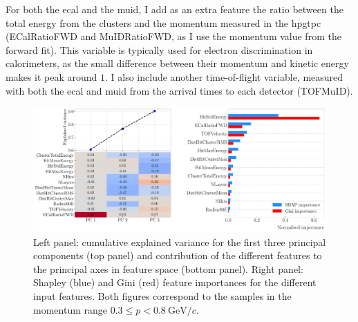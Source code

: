 For both the \gls{ecal} and the \gls{muid}, I add as an extra feature the ratio between the total energy from the clusters and the momentum measured in the \gls{hpgtpc} (ECalRatioFWD and MuIDRatioFWD, as I use the momentum value from the forward fit). This variable is typically used for electron discrimination in calorimeters, as the small difference between their momentum and kinetic energy makes it peak around $1$. I also include another time-of-flight variable, measured with both the \gls{ecal} and \gls{muid} from the arrival times to each detector (TOFMuID).

\begin{figure}[t]
	\centering
	\includegraphics[width=.95\linewidth]{Images/GArSoft_PID/BDT/summary_pca_p0_0.55_sigmap_0.25.pdf}
	\caption[Results of the \gls{pca}, Shapley and Gini feature importance analyses for the momentum range $0.3 \leq p < 0.8 ~ \mathrm{GeV}/c$.]{Left panel: cumulative explained variance for the first three principal components (top panel) and contribution of the different features to the principal axes in feature space (bottom panel). Right panel: Shapley (blue) and Gini (red) feature importances for the different input features. Both figures correspond to the samples in the momentum range $0.3 \leq p < 0.8 ~ \mathrm{GeV}/c$.}
	\label{fig:bdt_pca_importance_ii}
\end{figure}

